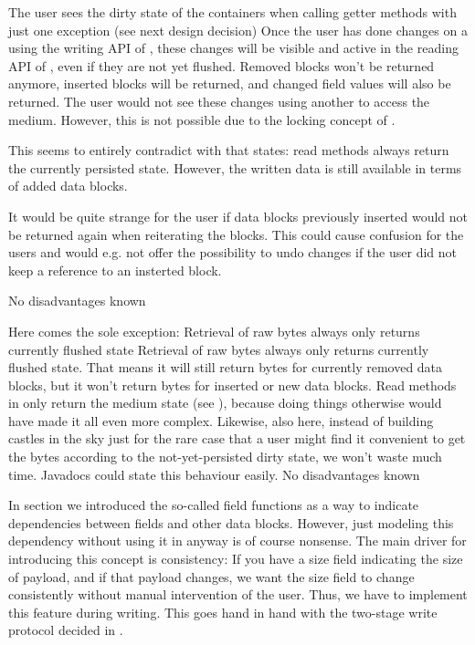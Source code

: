 {%
The user sees the dirty state of the containers when calling getter methods with just one exception (see next design decision)
}
{%
Once the user has done changes on a \IMediumStore{} using the writing API of \COMPdataPartManagement{}, these changes will be visible and active in the reading API of \COMPdataPartManagement{}, even if they are not yet flushed. Removed blocks won't be returned anymore, inserted blocks will be returned, and changed field values will also be returned. The user would not see these changes using another \IMediumStore{} to access the medium. However, this is not possible due to the locking concept of \COMPmedia{}.
}
{%
  This seems to entirely contradict with  that states: \COMPmedia{} read methods always return the currently persisted state. However, the written data is still available in terms of added data blocks.
  
It would be quite strange for the user if data blocks previously inserted would not be returned again when reiterating the blocks. This could cause confusion for the users and would e.g. not offer the possibility to undo changes if the user did not keep a reference to an insterted block.
}
{%
No disadvantages known
}

Here comes the sole exception:
{%
Retrieval of raw bytes always only returns currently flushed state
}
{%
Retrieval of raw bytes always only returns currently flushed state. That means it will still return bytes for currently removed data blocks, but it won't return bytes for inserted or new data blocks.
}
{%
Read methods in \COMPmedia{} only return the medium state (see ), because doing things otherwise would have made it all even more complex. Likewise, also here, instead of building castles in the sky just for the rare case that a user might find it convenient to get the bytes according to the not-yet-persisted dirty state, we won't waste much time. Javadocs could state this behaviour easily.
}
{%
No disadvantages known
}

In section  we introduced the so-called field functions as a way to indicate dependencies between fields and other data blocks. However, just modeling this dependency without using it in anyway is of course nonsense. The main driver for introducing this concept is consistency: If you have a size field indicating the size of payload, and if that payload changes, we want the size field to change consistently without manual intervention of the user. Thus, we have to implement this feature during writing. This goes hand in hand with the two-stage write protocol decided in .

